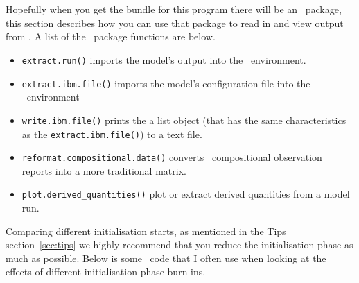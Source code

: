 \section{ \label{sec:post-processing}}

Hopefully when you get the bundle for this program there will be an \R\ package, this section describes how you can use that package to read in and view output from \IBM.  A list of the \R\ package functions are below.

\begin{itemize}
	\item \texttt{extract.run()} imports the model's output into the \R\ environment.
	\item \texttt{extract.ibm.file()} imports the model's configuration file into the \R\ environment
	\item \texttt{write.ibm.file()} prints the a list object (that has the same characteristics as the \texttt{extract.ibm.file()})	to a text file.
	\item \texttt{reformat.compositional.data()} converts \IBM\ compositional observation reports into a more traditional matrix.
	\item \texttt{plot.derived\_quantities()} plot or extract derived quantities from a model run.
\end{itemize}



Comparing different initialisation starts, as mentioned in the Tips section~\ref{sec:tips} we highly recommend that you reduce the initialisation phase as much as possible. Below is some \R\ code that I often use when looking at the effects of different initialisation phase burn-ins.

